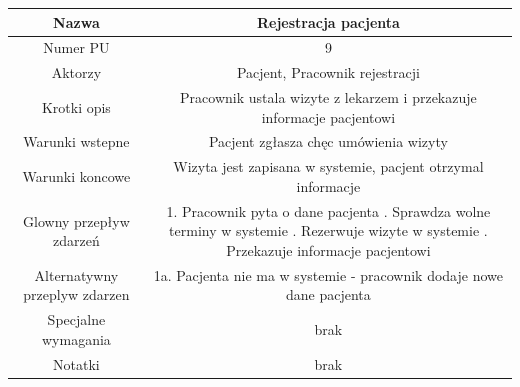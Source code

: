 \documentclass{article}
\begin{document}
\noindent
\begin{tabular}{|c|c|}%
        \hline
        Nazwa & Rejestracja pacjenta \\
        \hline
        Numer PU & 9\\
        \hline
        Aktorzy & Pacjent, Pracownik rejestracji\\
        \hline
        Krotki opis & Pracownik ustala wizyte z lekarzem i przekazuje informacje pacjentowi\\
        \hline
        Warunki wstepne & Pacjent zgłasza chęc umówienia wizyty\\
        \hline
        Warunki koncowe & Wizyta jest zapisana w systemie, pacjent otrzymal informacje\\
        \hline
        Glowny przepływ zdarzeń & 1. Pracownik pyta o dane pacjenta \newline
                                 2. Sprawdza wolne terminy w systemie \newline
                                 3. Rezerwuje wizyte w systemie \newline
                                 4. Przekazuje informacje pacjentowi  \\
        \hline
        Alternatywny przeplyw zdarzen &  1a. Pacjenta nie ma w systemie - pracownik dodaje nowe dane pacjenta\\
        \hline
        Specjalne wymagania & brak\\
        \hline
        Notatki& brak\\
        \hline
\end{tabular}

\vspace{1cm}
\end{document}
